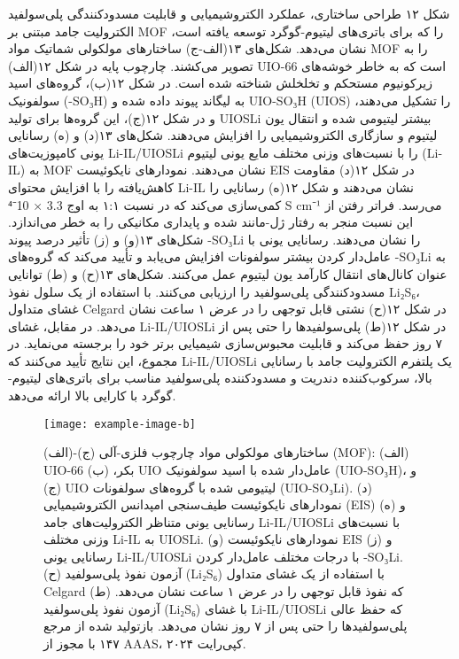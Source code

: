 \documentclass[12pt,a4paper,twocolumn]{article} %
\newcommand{\persian}[1]{\textfarsi{#1}}
\newcommand{\english}[1]{\textenglish{#1}}
\newcommand{\farsibold}[1]{{\farsifontbold{#1}}}
\begin{document}
\persian{
شکل ۱۲ طراحی ساختاری، عملکرد الکتروشیمیایی و قابلیت مسدودکنندگی پلی‌سولفید الکترولیت جامد مبتنی بر \english{MOF} را که برای باتری‌های لیتیوم-گوگرد توسعه یافته است، نشان می‌دهد. شکل‌های ۱۳(الف-ج) ساختارهای مولکولی شماتیک مواد \english{MOF} را به تصویر می‌کشند. چارچوب پایه در شکل ۱۲(الف) \english{UIO-66} است که به خاطر خوشه‌های زیرکونیوم مستحکم و تخلخلش شناخته شده است. در شکل ۱۲(ب)، گروه‌های اسید سولفونیک (\english{-SO₃H}) به لیگاند پیوند داده شده و \english{UIO-SO₃H} (\english{UIOS}) را تشکیل می‌دهند، و در شکل ۱۲(ج)، این گروه‌ها برای تولید \english{UIOSLi} بیشتر لیتیومی شده و انتقال یون لیتیوم و سازگاری الکتروشیمیایی را افزایش می‌دهند. شکل‌های ۱۳(د) و (ه) رسانایی یونی کامپوزیت‌های \english{Li-IL/UIOSLi} را با نسبت‌های وزنی مختلف مایع یونی لیتیوم (\english{Li-IL}) به \english{MOF} نشان می‌دهند. نمودارهای نایکوئیست \english{EIS} در شکل ۱۲(د) مقاومت کاهش‌یافته را با افزایش محتوای \english{Li-IL} نشان می‌دهند و شکل ۱۲(ه) رسانایی را کمی‌سازی می‌کند که در نسبت ۱:۱ به اوج \english{3.3 × 10⁻⁴ S cm⁻¹} می‌رسد. فراتر رفتن از این نسبت منجر به رفتار ژل-مانند شده و پایداری مکانیکی را به خطر می‌اندازد. شکل‌های ۱۳(و) و (ز) تأثیر درصد پیوند \english{-SO₃Li} را نشان می‌دهند. رسانایی یونی با عامل‌دار کردن بیشتر سولفونات افزایش می‌یابد و تأیید می‌کند که گروه‌های \english{-SO₃Li} به عنوان کانال‌های انتقال کارآمد یون لیتیوم عمل می‌کنند. شکل‌های ۱۳(ح) و (ط) توانایی مسدودکنندگی پلی‌سولفید را ارزیابی می‌کنند. با استفاده از یک سلول نفوذ \english{Li₂S₆}، غشای متداول \english{Celgard} در شکل ۱۲(ح) نشتی قابل توجهی را در عرض ۱ ساعت نشان می‌دهد. در مقابل، غشای \english{Li-IL/UIOSLi} در شکل ۱۲(ط) پلی‌سولفیدها را حتی پس از ۷ روز حفظ می‌کند و قابلیت محبوس‌سازی شیمیایی برتر خود را برجسته می‌نماید. در مجموع، این نتایج تأیید می‌کنند که \english{Li-IL/UIOSLi} یک پلتفرم الکترولیت جامد با رسانایی بالا، سرکوب‌کننده دندریت و مسدودکننده پلی‌سولفید مناسب برای باتری‌های لیتیوم-گوگرد با کارایی بالا ارائه می‌دهد.
}

\begin{figure*}[t]
    \centering
    \texttt{[image: example-image-b]} %
    \caption{\persian{
    \farsibold{شکل ۱۲.} (الف)-(ج) ساختارهای مولکولی مواد چارچوب فلزی-آلی (\english{MOF}): (الف) \english{UIO-66} بکر، (ب) \english{UIO} عامل‌دار شده با اسید سولفونیک (\english{UIO-SO₃H})، و (ج) \english{UIO} لیتیومی شده با گروه‌های سولفونات (\english{UIO-SO₃Li}). (د) نمودارهای نایکوئیست طیف‌سنجی امپدانس الکتروشیمیایی (\english{EIS}) و (ه) رسانایی یونی متناظر الکترولیت‌های جامد \english{Li-IL/UIOSLi} با نسبت‌های وزنی مختلف \english{Li-IL} به \english{UIOSLi}. (و) نمودارهای نایکوئیست \english{EIS} و (ز) رسانایی یونی \english{Li-IL/UIOSLi} با درجات مختلف عامل‌دار کردن \english{-SO₃Li}. (ح) آزمون نفوذ پلی‌سولفید (\english{Li₂S₆}) با استفاده از یک غشای متداول \english{Celgard} که نفوذ قابل توجهی را در عرض ۱ ساعت نشان می‌دهد. (ط) آزمون نفوذ پلی‌سولفید (\english{Li₂S₆}) با غشای \english{Li-IL/UIOSLi} که حفظ عالی پلی‌سولفیدها را حتی پس از ۷ روز نشان می‌دهد. بازتولید شده از مرجع ۱۴۷ با مجوز از \english{AAAS}، کپی‌رایت ۲۰۲۴.
    }}
    \label{fig:12}
\end{figure*}
\end{document}
